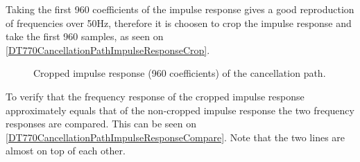 


% 	

Taking the first 960 coefficients of the impulse response gives a good reproduction of frequencies over 50Hz, therefore it is choosen to crop the impulse response and take the first 960 samples, as seen on \autoref{DT770CancellationPathImpulseResponseCrop}.


\begin{figure}[H]
	\centering
	
	\caption{Cropped impulse response (960 coefficients) of the cancellation path.}
	\label{DT770CancellationPathImpulseResponseCrop}
\end{figure}

To verify that the frequency response of the cropped impulse response approximately equals that of the non-cropped impulse response the two frequency responses are compared. This can be seen on \autoref{DT770CancellationPathImpulseResponseCompare}. Note that the two lines are almost on top of each other.


